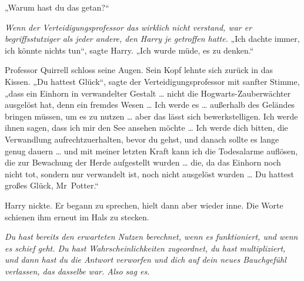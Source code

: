 „Warum hast du das getan?“

\emph{Wenn der Verteidigungsprofessor das wirklich nicht verstand, war er begriffsstutziger als jeder andere, den Harry je getroffen hatte.}
„Ich dachte immer, ich könnte nichts tun“, sagte Harry.
„Ich wurde müde, es zu denken.“

Professor Quirrell schloss seine Augen. Sein Kopf lehnte sich zurück in das Kissen.
„Du hattest Glück“, sagte der Verteidigungsprofessor mit sanfter Stimme,
„dass ein Einhorn in verwandelter Gestalt … nicht die Hogwarts-Zauberwächter ausgelöst hat, denn ein fremdes Wesen … Ich werde es … außerhalb des Geländes bringen müssen, um es zu nutzen … aber das lässt sich bewerkstelligen. Ich werde ihnen sagen, dass ich mir den See ansehen möchte … Ich werde dich bitten, die Verwandlung aufrechtzuerhalten, bevor du gehst, und danach sollte es lange genug dauern … und mit meiner letzten Kraft kann ich die Todesalarme auflösen, die zur Bewachung der Herde aufgestellt wurden … die, da das Einhorn noch nicht tot, sondern nur verwandelt ist, noch nicht ausgelöst wurden … Du hattest großes Glück, Mr~Potter.“

Harry nickte. Er begann zu sprechen, hielt dann aber wieder inne. Die Worte schienen ihm erneut im Hals zu stecken.

\emph{Du hast bereits den erwarteten Nutzen berechnet, wenn es funktioniert, und wenn es schief geht. Du hast Wahrscheinlichkeiten zugeordnet, du hast multipliziert, und dann hast du die Antwort verworfen und dich auf dein neues Bauchgefühl verlassen, das dasselbe war. Also sag es.}

